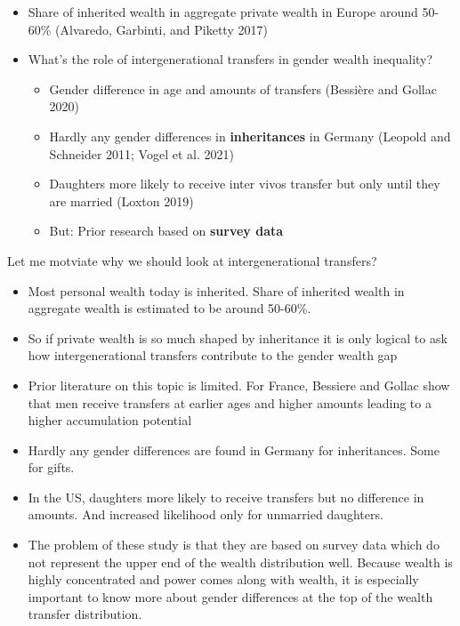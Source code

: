 \documentclass[
  letterpaper,
  DIV=11,
  numbers=noendperiod]{scrartcl}
\providecommand{\tightlist}{%
  \setlength{\itemsep}{0pt}\setlength{\parskip}{0pt}}\usepackage{longtable,booktabs,array}
\begin{document}
\begin{itemize}
\tightlist
\item
  Share of inherited wealth in aggregate private wealth in Europe around
  50-60\% (Alvaredo, Garbinti, and Piketty 2017)
\item
  What's the role of intergenerational transfers in gender wealth
  inequality?

  \begin{itemize}
  \item
    Gender diﬀerence in age and amounts of transfers (Bessière and
    Gollac 2020)
  \item
    Hardly any gender differences in \textbf{inheritances} in Germany
    (Leopold and Schneider 2011; Vogel et al. 2021)
  \item
    Daughters more likely to receive inter vivos transfer but only until
    they are married (Loxton 2019)
  \item
    But: Prior research based on \textbf{survey data}
  \end{itemize}
\end{itemize}

Let me motviate why we should look at intergenerational transfers?

\begin{itemize}
\item
  Most personal wealth today is inherited. Share of inherited wealth in
  aggregate wealth is estimated to be around 50-60\%.
\item
  So if private wealth is so much shaped by inheritance it is only
  logical to ask how intergenerational transfers contribute to the
  gender wealth gap
\item
  Prior literature on this topic is limited. For France, Bessiere and
  Gollac show that men receive transfers at earlier ages and higher
  amounts leading to a higher accumulation potential
\item
  Hardly any gender differences are found in Germany for inheritances.
  Some for gifts.
\item
  In the US, daughters more likely to receive transfers but no
  difference in amounts. And increased likelihood only for unmarried
  daughters.
\item
  The problem of these study is that they are based on survey data which
  do not represent the upper end of the wealth distribution well.
  Because wealth is highly concentrated and power comes along with
  wealth, it is especially important to know more about gender
  differences at the top of the wealth transfer distribution.
\end{itemize}
\end{document}
